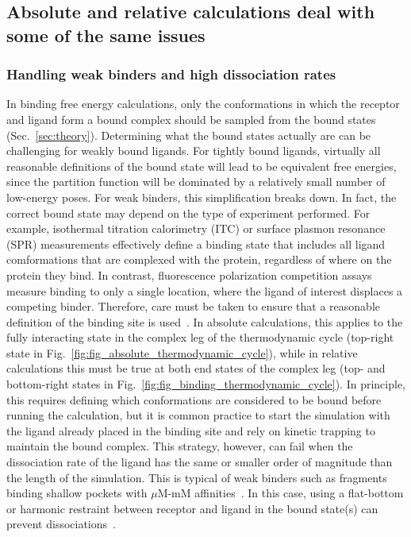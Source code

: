 \documentclass[9pt,bestpractices]{livecoms}
\begin{document}
\subsection{Absolute and relative calculations deal with some of the same issues}
\subsubsection{Handling weak binders and high dissociation rates}\label{sec:weak-binders}
In binding free energy calculations, only the conformations in which the receptor and ligand form a bound complex should be sampled from the bound states (Sec.~\ref{sec:theory}). Determining what the bound states actually are can be challenging for weakly bound ligands. For tightly bound ligands, virtually all reasonable definitions of the bound state will lead to be equivalent free energies, since the partition function will be dominated by a relatively small number of low-energy poses. For weak binders, this simplification breaks down.  In fact, the correct bound state may depend on the type of experiment performed.  For example, isothermal titration calorimetry (ITC) or surface plasmon resonance (SPR) measurements effectively define a binding state that includes all ligand comformations that are complexed with the protein, regardless of where on the protein they bind. In contrast, fluorescence polarization competition assays measure binding to only a single location, where the ligand of interest displaces a competing binder. Therefore, care must be taken to ensure that a reasonable definition of the binding site is used~\cite{wang2013identifying}.
In absolute calculations, this applies to the fully interacting state in the complex leg of the thermodynamic cycle (top-right state in Fig.~\ref{fig:fig_absolute_thermodynamic_cycle}), while in relative calculations this must be true at both end states of the complex leg (top- and bottom-right states in Fig.~\ref{fig:fig_binding_thermodynamic_cycle}).
In principle, this requires defining which conformations are considered to be bound before running the calculation, but it is common practice to start the simulation with the ligand already placed in the binding site and rely on kinetic trapping to maintain the bound complex.
This strategy, however, can fail when the dissociation rate of the ligand has the same or smaller order of magnitude than the length of the simulation.
This is typical of weak binders such as fragments binding shallow pockets with $\mu$M-mM affinities~\cite{georgiou2017pushing,pan2017quantitative}.
In this case, using a flat-bottom or harmonic restraint between receptor and ligand in the bound state(s) can prevent dissociations~\cite{georgiou2017pushing,rizzi2019sampl6}.
\end{document}
